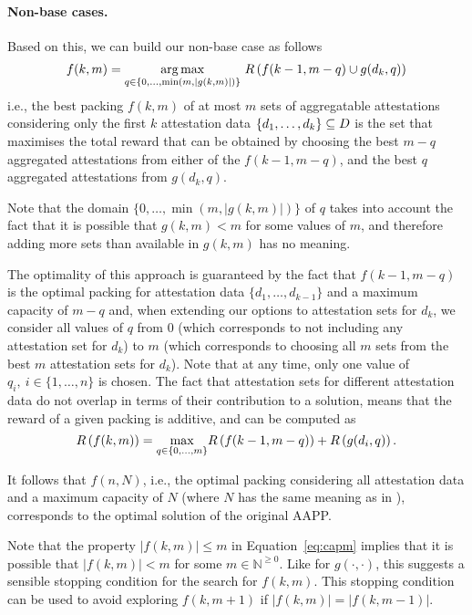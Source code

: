 \documentclass{article}
\begin{document}
\paragraph{Non-base cases.}
%
Based on this, we can build our non-base case as follows
%
\begin{align}
  f(k, m) = \underset{q \in \{ 0, \dots, \min\left(m, |g(k, m)|\right)
  \}}{\arg\max}~R\left( f(k-1, m-q) \cup g(d_k, q) \right)
\end{align}
%
i.e., the best packing $f(k, m)$ of at most $m$ sets of aggregatable
attestations considering only the first $k$ attestation data $\{ d_1, \dots,
d_k \} \subseteq D$ is the set that maximises the total reward that can be
obtained by choosing the best $m-q$ aggregated attestations from
either of the $f(k-1, m-q)$, and the best $q$ aggregated attestations
from $g(d_k, q)$. 

Note that the domain $\{0, \dots, \min\left(m, |g(k, m)|\right) \}$ of $q$
takes into account the fact that it is possible that $g(k, m) < m$ for some
values of $m$, and therefore adding more sets than available in $g(k, m)$ has
no meaning. 

The optimality of this approach is guaranteed by the fact that $f(k-1, m-q)$ is
the optimal packing for attestation data $\{ d_1, \dots, d_{k-1} \}$ and a
maximum capacity of $m-q$ and, when extending our options to attestation sets
for $d_k$, we consider all values of $q$ from $0$ (which corresponds to not
including any attestation set for $d_k$) to $m$ (which corresponds to choosing
all $m$ sets from the best $m$ attestation sets for $d_k$). Note that at any
time, only one value of $q_i,~i \in \{1, \dots, n\}$ is chosen. The fact that
attestation sets for different attestation data do not overlap in terms of
their contribution to a solution, means that the reward of a given packing is
additive, and can be computed as
%
\begin{equation}
  R\left(f(k, m)\right) = \underset{q \in \{0, \dots, m\}}{\max} R\left(f(k-1,
  m-q)\right) + R\left(g(d_i, q)\right).
\end{equation}

It follows that $f(n, N)$, i.e., the optimal packing considering all
attestation data and a maximum capacity of $N$ (where $N$ has the same meaning
as in \cite{Satalia22a}), corresponds to the optimal solution of the original
AAPP.

Note that the property $|f(k, m)| \leq m$ in Equation~\ref{eq:capm} implies
that it is possible that $|f(k, m)| < m$ for some $m \in \mathbb{N}^{\geq 0}$.
Like for $g(\cdot, \cdot)$, this suggests a sensible stopping condition for the
search for $f(k, m)$. This stopping condition can be used to avoid exploring
$f(k, m+1)$ if $|f(k, m)| = |f(k, m-1)|$.
\end{document}
